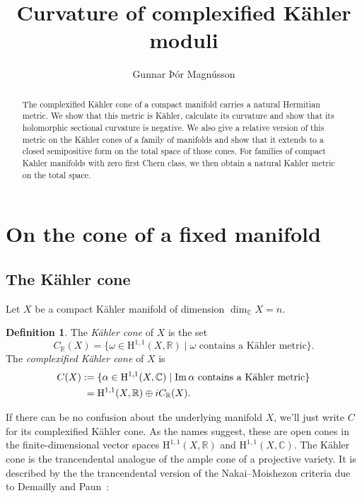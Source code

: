 \documentclass[11pt,a4paper]{amsart}
\title{Curvature of complexified K\"{a}hler moduli}
\author{Gunnar Þór Magnússon}
\theoremstyle{definition}
\newtheorem*{defi}{Definition}
\theoremstyle{remark}
\newcommand{\RR}{\mathbb{R}}
\newcommand{\CC}{\mathbb{C}}
\def\Im{\mathop{\rm Im}}
\def\coho#1{\mathrm{H}^{#1}}
\def\kf{\omega}
\def\ckf{\alpha}
\def\KC{C}
\begin{document}
\begin{abstract}
The complexified K\"{a}hler cone of a compact manifold carries a natural
Hermitian metric. We show that this metric is K\"{a}hler, calculate
its curvature and show that its holomorphic sectional curvature is
negative. We also give a relative version of this metric on the
K\"{a}hler cones of a family of manifolds and show that it extends to a
closed semipositive form on the total space of those cones. For families
of compact Kahler manifolds with zero first Chern class, we then obtain
a natural Kahler metric on the total space.
\end{abstract}

\maketitle



\section{On the cone of a fixed manifold}
\label{section:fixemanifold}

\subsection*{The K\"{a}hler cone}
Let $X$ be a compact K\"{a}hler manifold of dimension $\dim_{\CC} X = n$.

\begin{defi}
The \emph{K\"{a}hler cone} of $X$ is the set
\begin{equation*}
C_{\RR}(X) = \{ \kf \in \coho{1,1}(X,\RR) 
\mid
\text{$\kf$ contains a K\"{a}hler metric}
\}.
\end{equation*}
The \emph{complexified K\"{a}hler cone} of $X$ is
\begin{align*}
\KC(X) 
&:=
\{ \ckf \in \coho{1,1}(X,\CC) 
\mid
\text{$\Im\ckf$ contains a K\"{a}hler metric}
\}
\\
&\phantom{:}= \coho{1,1}(X,\RR) \oplus i C_{\RR}(X).
\end{align*}
\end{defi}

If there can be no confusion about the underlying manifold $X$, we'll
just write $C$ for its complexified K\"{a}hler cone.
As the names suggest, these are open cones in the finite-dimensional
vector spaces $\coho{1,1}(X,\RR)$ and $\coho{1,1}(X,\CC)$. The K\"{a}hler
cone is the trancendental analogue of the ample cone of a projective
variety. It is described by the the trancendental version of the 
Nakai--Moishezon criteria due to Demailly and Paun~\cite{DemaillyPaun}:
\end{document}
